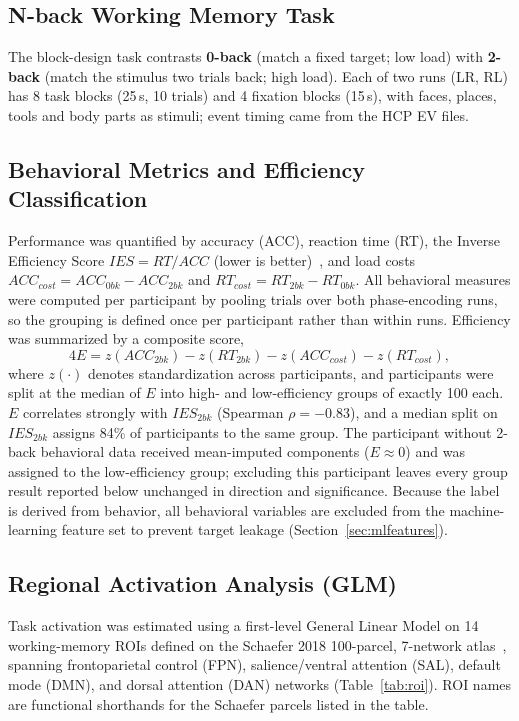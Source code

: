 \documentclass[conference]{IEEEtran}
\begin{document}
\subsection{N-back Working Memory Task}
The block-design task contrasts \textbf{0-back} (match a fixed target; low load) with \textbf{2-back} (match the stimulus two trials back; high load). Each of two runs (LR, RL) has 8 task blocks (25\,s, 10 trials) and 4 fixation blocks (15\,s), with faces, places, tools and body parts as stimuli; event timing came from the HCP EV files.

\subsection{Behavioral Metrics and Efficiency Classification}
\label{sec:behav}
Performance was quantified by accuracy (ACC), reaction time (RT), the Inverse Efficiency Score $IES=RT/ACC$ (lower is better)~\cite{townsend2014methods}, and load costs $ACC_{cost}=ACC_{0bk}-ACC_{2bk}$ and $RT_{cost}=RT_{2bk}-RT_{0bk}$. All behavioral measures were computed per participant by pooling trials over both phase-encoding runs, so the grouping is defined once per participant rather than within runs. Efficiency was summarized by a composite score,
\begin{equation}
4E = z(ACC_{2bk}) - z(RT_{2bk}) - z(ACC_{cost}) - z(RT_{cost}),
\end{equation}
where $z(\cdot)$ denotes standardization across participants, and participants were split at the median of $E$ into high- and low-efficiency groups of exactly 100 each. $E$ correlates strongly with $IES_{2bk}$ (Spearman $\rho=-0.83$), and a median split on $IES_{2bk}$ assigns 84\% of participants to the same group. The participant without 2-back behavioral data received mean-imputed components ($E\approx 0$) and was assigned to the low-efficiency group; excluding this participant leaves every group result reported below unchanged in direction and significance. Because the label is derived from behavior, all behavioral variables are excluded from the machine-learning feature set to prevent target leakage (Section~\ref{sec:mlfeatures}).

\subsection{Regional Activation Analysis (GLM)}
Task activation was estimated using a first-level General Linear Model on 14 working-memory ROIs defined on the Schaefer 2018 100-parcel, 7-network atlas~\cite{schaefer2018local}, spanning frontoparietal control (FPN), salience/ventral attention (SAL), default mode (DMN), and dorsal attention (DAN) networks (Table~\ref{tab:roi}). ROI names are functional shorthands for the Schaefer parcels listed in the table.
\end{document}
